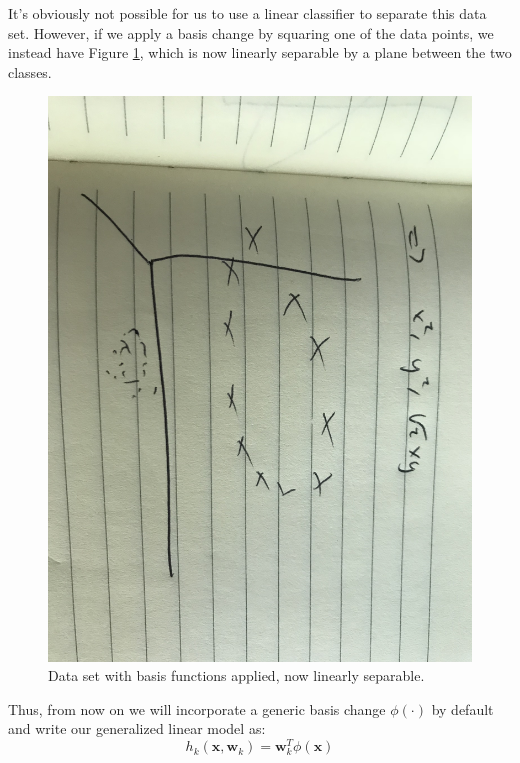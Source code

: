 It's obviously not possible for us to use a linear classifier to separate this data set. However, if we apply a basis change by squaring one of the data points, we instead have Figure \ref{fig:circles-with-basis-change}, which is now linearly separable by a plane between the two classes.
\begin{figure}
    \centering
    \includegraphics[width=0.5\paperwidth]{../Classification/fig/circles_with_basis_change.jpg}
    \caption{Data set with basis functions applied, now linearly separable.}
    \label{fig:circles-with-basis-change}
\end{figure}
Thus, from now on we will incorporate a generic basis change $\phi(\cdot)$ by default and write our generalized linear model as:
\begin{equation} \label{basis-changed-linear-model}
	h_{k}(\textbf{x}, \textbf{w}_{k}) = \textbf{w}_{k}^{T}\phi{(\textbf{x})}
\end{equation}

